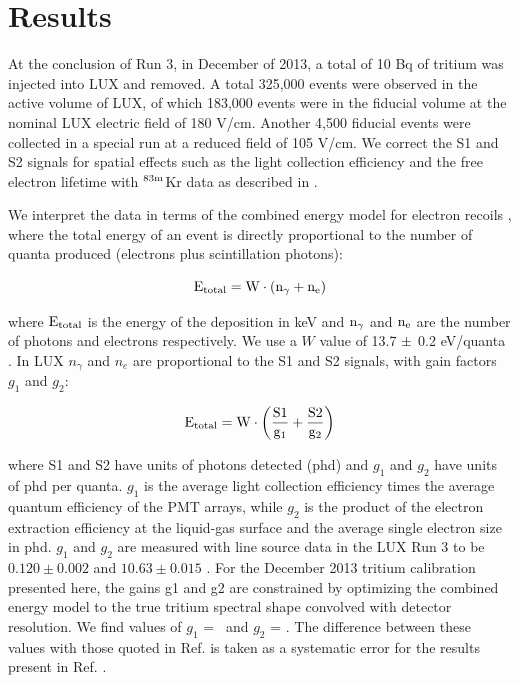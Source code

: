 \section{Results}

At the conclusion of Run 3, in December of 2013, a total of 10 Bq of tritium was injected into LUX and removed. A total 325,000 events were observed in the active volume of LUX, of which 183,000 events were in the fiducial volume at the nominal LUX electric field of 180 V/cm. Another 4,500 fiducial events were collected in a special run at a reduced field of 105 V/cm. We correct the S1 and S2 signals for spatial effects such as the light collection efficiency and the free electron lifetime with $\rm ^{83m}$Kr data as described in \cite{lux-reanalysis}. 


We interpret the data in terms of the combined energy model for electron recoils \cite{Platzman}, where the total energy of an event is directly proportional to the number of quanta produced (electrons plus scintillation photons):

\begin{equation}
\rm E_{total} = W \cdot (n_{\gamma} + n_e )
\label{platzman_eq}
\end{equation}

\noindent
where $\rm E_{total}$ is the energy of the deposition in keV and  $\rm n_\gamma$ and $\rm n_e$ are the number of photons and electrons respectively. We use a $W$ value of 13.7 $\rm \pm$ 0.2 eV/quanta \cite{Dahl_Thesis}. In LUX $n_{\gamma}$ and $n_e$ are proportional to the S1 and S2 signals, with gain factors $g_1$ and $g_2$: 

\begin{equation}
\rm E_{total} = W \cdot \left(\frac{S1}{g_1} + \frac{S2}{g_2} \right)
\label{energy_eq}
\end{equation}

\noindent
where S1 and S2 have units of photons detected (phd) and $g_1$ and $g_2$ have units of phd per quanta. $g_1$ is the average light collection efficiency times the average quantum efficiency of the PMT arrays, while $g_2$ is the product of the electron extraction efficiency at the liquid-gas surface and the average single electron size in phd. $g_1$ and $g_2$ are measured with line source data in the LUX Run 3 to be $0.120 \pm 0.002$ and $10.63 \pm 0.015$ \cite{lux-reanalysis, lux-prd}. For the December 2013 tritium calibration presented here, the gains g1 and g2 are constrained by optimizing the combined energy model to the true tritium spectral shape \cite{Tritium_Eq_Simpson} convolved with detector resolution. We find values of $g_1$ = \gone  ~and  $g_2$ = \gtwo.  The difference between these values with those quoted in Ref. \cite{lux-reanalysis, lux-prd} is taken as a systematic error for the results present in Ref. \cite{lux-reanalysis, lux-prd}.

